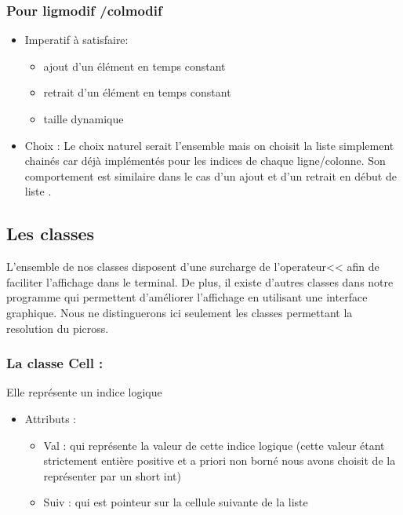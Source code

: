 \documentclass{article}
\begin{document}
\subsubsection{Pour ligmodif /colmodif}
\begin{itemize}
\item Imperatif \`a satisfaire:
\begin{itemize}
\item ajout d'un \'el\'ement en temps constant
\item retrait d'un \'el\'ement en temps constant
\item taille dynamique
\end{itemize}
\item Choix :
Le choix naturel serait l'ensemble mais on choisit la liste simplement chain\'es car d\'ej\`a  impl\'ement\'es pour les indices de chaque ligne/colonne. Son
comportement est similaire dans le cas d'un ajout et d'un retrait en d\'ebut de liste .
\end{itemize}
\subsection{ Les classes}
L'ensemble de nos classes disposent d'une surcharge de l'operateur<< afin de faciliter l'affichage dans le terminal. De plus, il existe d'autres classes dans notre
programme qui permettent d'am\'eliorer l'affichage en utilisant une interface graphique. Nous ne distinguerons ici seulement les classes permettant la
resolution du picross.

\subsubsection{La classe Cell :}
Elle repr\'esente un indice logique
\begin{itemize}
\item Attributs :
\begin{itemize}
\item Val : qui repr\'esente la valeur de cette indice logique (cette valeur \'etant strictement enti\`ere positive et a priori non born\'e nous avons choisit de la repr\'esenter par un short int)
\item Suiv : qui est pointeur sur la cellule suivante de la liste
\end{itemize}
\end{itemize}
\end{document}
